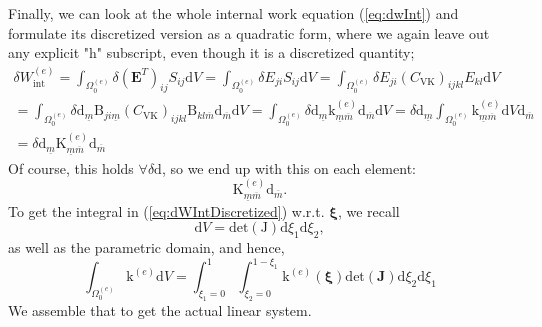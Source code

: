 \documentclass[12pt,a4paper]{article}
\makeatletter
\theoremstyle{remark} %
\newcommand{\bu}[1]{\bm{\mathrm #1}} %
\newcommand{\comment}[1]{ }  %
\renewcommand{\cleardoublepage}{\clearpage\if@twoside \ifodd\c@page\else
	\hbox{}
	\vspace*{\fill}
	\thispagestyle{empty}
	\newpage
	\if@twocolumn\hbox{}\newpage\fi\fi\fi}
\numberwithin{equation}{section} %
\makeatother
\begin{document}
Finally, we can look at the whole internal work equation (\ref{eq:dwInt}) and formulate its discretized version as a quadratic form, where we again leave out any explicit "h" subscript, even though it is a discretized quantity;
\begin{align} \label{eq:dWIntDiscretized}
	\delta W_{\text{int}}^{(e)} = \int_{\Omega_0^{(e)}} \delta (\bm E^T)_{ij} S_{ij} \mathrm d V
	= \int_{\Omega_0^{(e)}} \delta E_{ji} S_{ij} \mathrm d V
	= \int_{\Omega_0^{(e)}} \delta E_{ji} (C_{\text{VK}})_{ijkl} E_{kl} \mathrm d V \nonumber \\
	= \int_{\Omega_0^{(e)}} \delta \mathrm d_{\underline m} \mathrm B_{ji \underline m} (C_{\text{VK}})_{ijkl} \mathrm B_{kl \overline m} \mathrm d_{\overline m} \mathrm d V
	= \int_{\Omega_0^{(e)}} \delta \mathrm d_{\underline m} \mathrm k^{(e)}_{\underline m \overline m} \mathrm d_{\overline m} \mathrm d V
	= \delta \mathrm d_{\underline m} \int_{\Omega_0^{(e)}} \mathrm k^{(e)}_{\underline m \overline m} \mathrm d V \mathrm d_{\overline m} \nonumber \\
	= \delta \mathrm d_{\underline m} \mathrm K^{(e)}_{\underline m \overline m} \mathrm d_{\overline m}
\end{align}
Of course, this holds $\forall \delta \bu d$, so we end up with this on each element:
\begin{equation}
	\mathrm K^{(e)}_{\underline m \overline m} \mathrm d_{\overline m} .
\end{equation}
To get the integral in (\ref{eq:dWIntDiscretized}) w.r.t. $\bm \xi$, we recall
\begin{equation}
	\mathrm d V = \text{det}(\bu J) \mathrm d \xi_1 \mathrm d \xi_2 ,
\end{equation}
as well as the parametric domain, and hence,
\begin{equation}
	\int_{\Omega_0^{(e)}} \bu k^{(e)} \mathrm d V
	= \int_{\xi_1=0}^{1} \int_{\xi_2=0}^{1-\xi_1} \bu k^{(e)}(\bm \xi) \text{det}(\bm J) \mathrm d \xi_2 \mathrm d \xi_1
\end{equation}
%
We assemble that to get the actual linear system.







\comment{
	\cleardoublepage
	\addcontentsline{toc}{section}{References}
	\printbibliography
	
}
\end{document}
